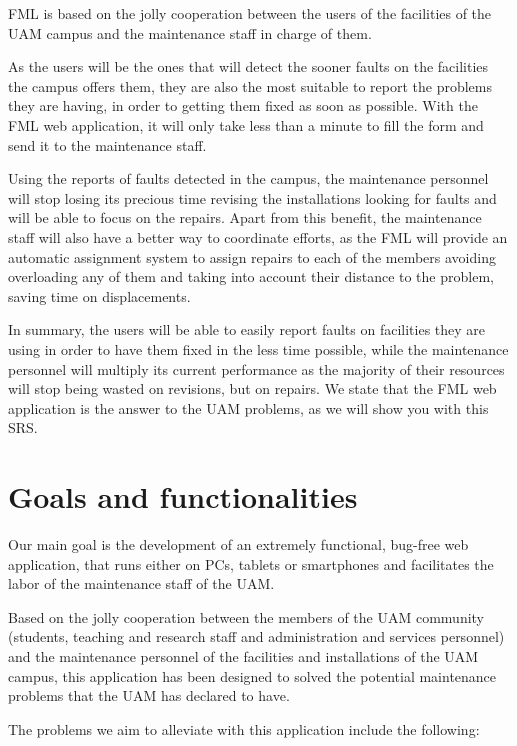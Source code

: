 \documentclass{report}
\begin{document}
FML is based on the jolly cooperation between the users of the facilities of the UAM campus and the maintenance staff in charge of them.

As the users will be the ones that will detect the sooner faults on the facilities the campus offers them, they are also the most suitable to report the problems they are having, in order to getting them fixed as soon as possible. With the FML web application, it will only take less than a minute to fill the form and send it to the maintenance staff.

Using the reports of faults detected in the campus, the maintenance personnel will stop losing its precious time revising the installations looking for faults and will be able to focus on the repairs. Apart from this benefit, the maintenance staff will also have a better way to coordinate efforts, as the FML will provide an automatic assignment system to assign repairs to each of the members avoiding overloading any of them and taking into account their distance to the problem, saving time on displacements.

In summary, the users will be able to easily report faults on facilities they are using in order to have them fixed in the less time possible, while the maintenance personnel will multiply its current performance as the majority of their resources will stop being wasted on revisions, but on repairs. We state that the FML web application is the answer to the UAM problems, as we will show you with this SRS.


\section{Goals and functionalities}

Our main goal is the development of an extremely functional, bug-free web application, that runs either on PCs, tablets or smartphones and facilitates the labor of the maintenance staff of the UAM.

Based on the jolly cooperation between the members of the UAM community (students, teaching and research staff and administration and services personnel) and the maintenance personnel of the facilities and installations of the UAM campus, this application has been designed to solved the potential maintenance problems that the UAM has declared to have.

The problems we aim to alleviate with this application include the following:
\end{document}
